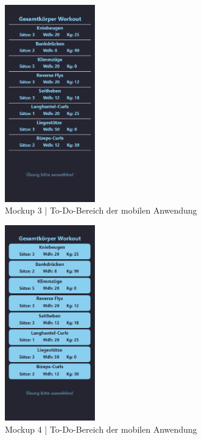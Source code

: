\begin{figure}[!htb]
    \centering
    \includegraphics[width=0.35\textwidth]{pics/todolist3.png}
    \caption{Mockup 3 | To-Do-Bereich der mobilen Anwendung}
    \label{fig:todolist3}
\end{figure}
\begin{figure}[!htb]
    \centering
    \includegraphics[width=0.35\textwidth]{pics/todolist4.png}
    \caption{Mockup 4 | To-Do-Bereich der mobilen Anwendung}
    \label{fig:todolist4}
\end{figure}
\FloatBarrier

